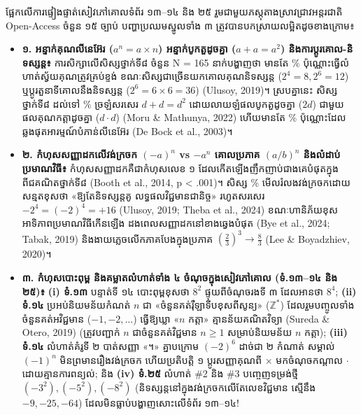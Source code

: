 \documentclass[a4paper,12pt]{article}
\newcommand{\en}[1]{{\TimesEn #1}}
\begin{document}
ផ្អែកលើការផ្ទៀងផ្ទាត់សៀវភៅគោលទំព័រ ១៣\en{--}១៤ និង ២៥ រួមជាមួយភស្តុតាងស្រាវជ្រាវអន្តរជាតិ \en{Open-Access} ចំនួន ១៥ ច្បាប់ បញ្ហាប្រឈមស្នូលទាំង ៣ ត្រូវបានបកស្រាយលម្អិតដូចខាងក្រោម៖
\begin{itemize}[leftmargin=0.65cm, itemsep=0.8pt]
  \item \textbf{១\en{.} អន្ទាក់គុណលីនេអ៊ែរ ($a^n = a\times n$) អន្ទាក់បូកតួដូចគ្នា ($a+a=a^2$) និងការប្ដូរគោល-និទស្សន្ត៖} ការសិក្សាលើសិស្សថ្នាក់ទី៨ ចំនួន \en{N = 165} នាក់បង្ហាញថា មានតែ \en{3.5\%} ប៉ុណ្ណោះធ្វើលំហាត់ស្វ័យគុណត្រូវគ្រប់ខ្ទង់ ខណៈសិស្សជាច្រើនយកគោលគុណនិទស្សន្ត ($2^4=8, 2^6=12$) ឬប្ដូរតួនាទីគោលនឹងនិទស្សន្ត ($2^6=6\times 6=36$) \en{(Ulusoy, 2019)}។ ស្របគ្នានេះ សិស្សថ្នាក់ទី៨ ដល់ទៅ \en{63.2\%} ច្រឡំសរសេរ $d+d=d^2$ ដោយលាយឡំផលបូកតួដូចគ្នា ($2d$) ជាមួយផលគុណកត្តាដូចគ្នា ($d\cdot d$) \en{(Moru \& Mathunya, 2022)} ហើយមានតែ \en{23\%} ប៉ុណ្ណោះដែលឆ្លងផុតអារម្មណ៍បំភាន់លីនេអ៊ែរ \en{(De Bock et al., 2003)}។
  \item \textbf{២\en{.} កំហុសសញ្ញាដកលើវង់ក្រចក \en{$(-a)^n$ vs $-a^n$} គោលប្រភាគ \en{$(a/b)^n$} និងលំដាប់ប្រមាណវិធី៖} កំហុសសញ្ញាដកគឺជាកំហុសលេខ ១ ដែលកើតឡើងញឹកញាប់ជាងគេបំផុតក្នុងពីជគណិតថ្នាក់ទី៨ \en{(Booth et al., 2014, p < .001)}។ សិស្ស \en{30.9\%} មើលរំលងវង់ក្រចកដោយសន្មតខុសថា «ឱ្យតែនិទស្សន្តគូ លទ្ធផលវិជ្ជមានជានិច្ច» រហូតសរសេរ $-2^4 = (-2)^4 = +16$ \en{(Ulusoy, 2019; Theba et al., 2024)} ខណៈហានិភ័យខុសអាទិភាពប្រមាណវិធីកើនឡើង \en{3.28} ដងពេលសញ្ញាដកនៅខាងឆ្វេងបំផុត \en{(Bye et al., 2024; Tabak, 2019)} និងងាយភ្លេចលើកភាគបែងក្នុងប្រភាគ $(\frac{2}{3})^3 \to \frac{8}{3}$ \en{(Lee \& Boyadzhiev, 2020)}។
  \item \textbf{៣\en{.} កំហុសបោះពុម្ព និងគម្លាតលំហាត់ទាំង ៤ ចំណុចក្នុងសៀវភៅគោល (ទំ\en{.}១៣\en{--}១៤ និង ២៥)៖} \textbf{(i) ទំ\en{.}១៣} បន្ទាត់ទី ១៤ បោះពុម្ពខុសថា \en{$8^2$} ផ្ទុយពីចំណុចរងទី ៣ ដែលអានថា \en{$8^4$}; \textbf{(ii) ទំ\en{.}១៤} ប្រអប់និយមន័យកំណត់ $n$ ជា «ចំនួនគត់រ៉ឺឡាទីបខុសពីសូន្យ» ($\mathbb{Z}^*$) ដែលរួមបញ្ចូលទាំងចំនួនគត់អវិជ្ជមាន ($-1, -2, \dots$) ធ្វើឱ្យឃ្លា «$n$ កត្តា» គ្មានន័យគណិតវិទ្យា \en{(Sureda \& Otero, 2019)} (ត្រូវបញ្ជាក់ $n$ ជាចំនួនគត់វិជ្ជមាន $n\ge 1$ សម្រាប់និយមន័យ $n$ កត្តា); \textbf{(iii) ទំ\en{.}១៤} លំហាត់គំរូទី ២ បាត់សញ្ញា «។» គ្នាបក្រោម \en{$(-2)^6$} ដាច់ជា ២ កំណាត់ សម្គាល់ \en{$(-1)^n$} មិនព្រមានរឿងវង់ក្រចក ហើយប្រតិបត្តិ ១ ប្ដូរសញ្ញាគុណពី $\times$ មកចំណុចកណ្ដាល $\cdot$ ដោយគ្មានការពន្យល់; និង \textbf{(iv) ទំ\en{.}២៥} លំហាត់ \en{\#2} និង \en{\#3} បញ្ចេញទម្រង់ថ្មី \en{$(-3^2), (-5^2), (-8^2)$} (និទស្សន្តនៅក្នុងវង់ក្រចកលើតែលេខវិជ្ជមាន ស្មើនឹង $-9, -25, -64$) ដែលមិនធ្លាប់បង្ហាញសោះលើទំព័រ ១៣\en{--}១៤!
\end{itemize}
\end{document}
